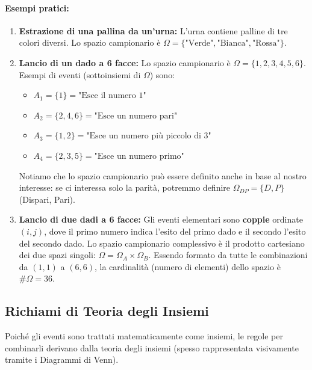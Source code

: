\documentclass[12pt, a4paper]{article}
\begin{document}
\paragraph{Esempi pratici:}
\begin{enumerate}
    \item \textbf{Estrazione di una pallina da un'urna:} L'urna contiene palline di tre colori diversi. Lo spazio campionario è $\Omega = \{\text{"Verde"}, \text{"Bianca"}, \text{"Rossa"}\}$.
    \item \textbf{Lancio di un dado a 6 facce:} Lo spazio campionario è $\Omega = \{1, 2, 3, 4, 5, 6\}$. Esempi di eventi (sottoinsiemi di $\Omega$) sono:
    \begin{itemize}
        \item $A_1 = \{1\} = \text{"Esce il numero 1"}$ 
        \item $A_2 = \{2, 4, 6\} = \text{"Esce un numero pari"}$ 
        \item $A_3 = \{1, 2\} = \text{"Esce un numero più piccolo di 3"}$ 
        \item $A_4 = \{2, 3, 5\} = \text{"Esce un numero primo"}$ 
    \end{itemize}
    Notiamo che lo spazio campionario può essere definito anche in base al nostro interesse: se ci interessa solo la parità, potremmo definire $\Omega_{DP} = \{D, P\}$ (Dispari, Pari).
    
    \item \textbf{Lancio di due dadi a 6 facce:} Gli eventi elementari sono \textbf{coppie} ordinate $(i,j)$, dove il primo numero indica l'esito del primo dado e il secondo l'esito del secondo dado. Lo spazio campionario complessivo è il prodotto cartesiano dei due spazi singoli: $\Omega = \Omega_A \times \Omega_B$. Essendo formato da tutte le combinazioni da $(1,1)$ a $(6,6)$, la cardinalità (numero di elementi) dello spazio è $\#\Omega = 36$.
\end{enumerate}

\subsection{Richiami di Teoria degli Insiemi}
Poiché gli eventi sono trattati matematicamente come insiemi, le regole per combinarli derivano dalla teoria degli insiemi (spesso rappresentata visivamente tramite i Diagrammi di Venn).
\end{document}
